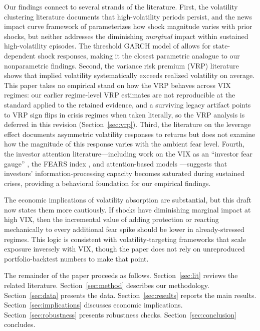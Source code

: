 \documentclass[12pt,a4paper]{article}
\begin{document}
Our findings connect to several strands of the literature. First, the volatility clustering literature \citep{engle1982, bollerslev1986} documents that high-volatility periods persist, and the news impact curve framework of \citet{engle1993} parameterizes how shock magnitude varies with prior shocks, but neither addresses the diminishing \textit{marginal} impact within sustained high-volatility episodes. The threshold GARCH model of \citet{zakoian1994} allows for state-dependent shock responses, making it the closest parametric analogue to our nonparametric findings. Second, the variance risk premium (VRP) literature \citep{bollerslev2009, carr2009, todorov2010} shows that implied volatility systematically exceeds realized volatility on average. This paper takes no empirical stand on how the VRP behaves across VIX regimes: our earlier regime-level VRP estimates are not reproducible at the standard applied to the retained evidence, and a surviving legacy artifact points to VRP sign flips in crisis regimes when taken literally, so the VRP analysis is deferred in this revision (Section~\ref{sec:vrp}). Third, the literature on the leverage effect \citep{black1976, christie1982} documents asymmetric volatility responses to returns but does not examine how the magnitude of this response varies with the ambient fear level. Fourth, the investor attention literature---including work on the VIX as an ``investor fear gauge'' \citep{whaley2000}, the FEARS index \citep{da2015}, and attention-based models \citep{andrei2015}---suggests that investors' information-processing capacity becomes saturated during sustained crises, providing a behavioral foundation for our empirical findings.

The economic implications of volatility absorption are substantial, but this draft now states them more cautiously. If shocks have diminishing marginal impact at high VIX, then the incremental value of adding protection or reacting mechanically to every additional fear spike should be lower in already-stressed regimes. This logic is consistent with volatility-targeting frameworks that scale exposure inversely with VIX, though the paper does not rely on unreproduced portfolio-backtest numbers to make that point.

The remainder of the paper proceeds as follows. Section~\ref{sec:lit} reviews the related literature. Section~\ref{sec:method} describes our methodology. Section~\ref{sec:data} presents the data. Section~\ref{sec:results} reports the main results. Section~\ref{sec:implications} discusses economic implications. Section~\ref{sec:robustness} presents robustness checks. Section~\ref{sec:conclusion} concludes.
\end{document}
